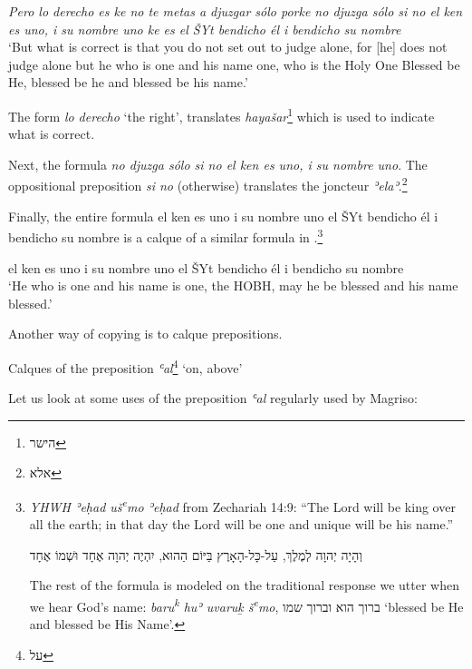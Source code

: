 \documentclass[output=paper,colorlinks,citecolor=brown,babel,arabicfont]{langscibook}
\begin{document}
\ea\label{ch3.7.ex.n29}
\textit{Pero lo derecho es ke no te metas a djuzgar sólo porke no djuzga sólo si no el ken es uno, i su nombre uno ke es el ŠYt bendicho él i bendicho su nombre} \\
`But what is correct is that you do not set out to judge alone, for [he] does not judge alone but he who is one and his name one, who is the Holy One Blessed be He, blessed be he and blessed be his name.'
\z

The form \textit{lo derecho} `the right', translates  \textit{hayašar}\footnote{\texthebrew{הישר}} which is used to indicate what is correct. 

Next, the formula \textit{no djuzga sólo si no el ken es uno, i su nombre uno}. The oppositional preposition \textit{si no} (otherwise) translates the  joncteur \textit{ʾelaʾ}.\footnote{\texthebrew{אלא}}

Finally, the entire formula el ken es uno i su nombre uno el ŠYt bendicho él i bendicho su nombre is a calque of a similar formula in .\footnote{\textit{YHWH ʾeḥad uš\textsuperscript{e}mo ʾeḥad} from Zechariah 14:9: ``The Lord will be king over all the earth; in that day the Lord will be one and unique will be his name.''

\texthebrew{וְהָיָה יְהוָה לְמֶלֶךְ, עַל-כָּל-הָאָרֶץ בַּיּוֹם הַהוּא, יִהְיֶה יְהוָה אֶחָד וּשְׁמוֹ אֶחָד}

The rest of the formula is modeled on the traditional response we utter when we hear God's name: \textit{baru\textsuperscript{k} huʾ uvaru\b{k} š\textsuperscript{e}mo}, \texthebrew{ברוך הוא וברוך שמו} `blessed be He and blessed be His Name'.} 

\ea\label{ch3.7.ex.n30}
el ken es uno i  su nombre uno el ŠYt  bendicho él i bendicho su nombre \\
`He who is one and his name is one, the HOBH, may he be blessed and his name blessed.'
\z

\label{ch3.7.ss.3.3.1.2}

Another way of copying  is to calque  prepositions. 

\begin{description}

\item[Calques of the  preposition \textit{ʿal}\footnote{\texthebrew{על}} `on, above']
\end{description}

Let us look at some uses of the  preposition \textit{ʿal} regularly used by Magriso:
\end{document}
